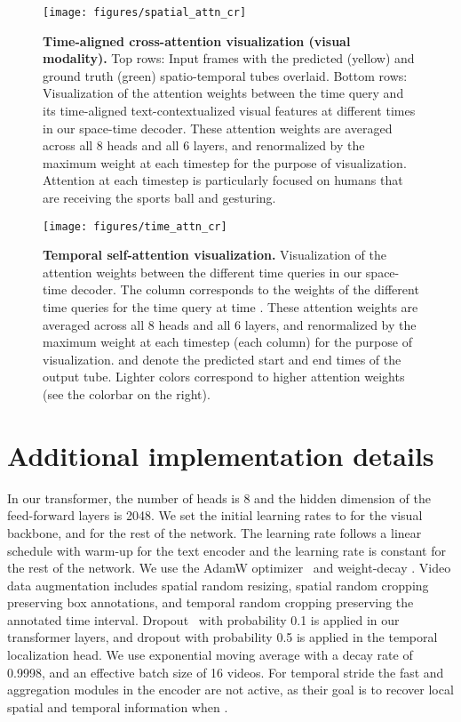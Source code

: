 \begin{figure*}[t]
\centering
\texttt{[image: figures/spatial\_attn\_cr]} 
\caption{\small \textbf{Time-aligned cross-attention visualization (visual modality).} 
Top rows: Input frames with the predicted (yellow) and ground truth (green) spatio-temporal tubes overlaid.
Bottom rows: Visualization of the attention weights between the time query and its time-aligned text-contextualized visual features at different times in our space-time decoder. 
These attention weights are averaged across all 8 heads and all 6 layers, and renormalized by the maximum weight at each timestep for the purpose of visualization.
Attention at each timestep is particularly focused on humans that are receiving the sports ball and gesturing.
}
\label{fig:spaceattn}
\vspace{-1cm}
\end{figure*}

\begin{figure*}[!htbp]
\centering
\texttt{[image: figures/time\_attn\_cr]}
\caption{\small \textbf{Temporal self-attention visualization.}
Visualization of the attention weights between the different time queries in our space-time decoder. 
The column  corresponds to the weights of the different time queries for the time query at time .
These attention weights are averaged across all 8 heads and all 6 layers, and renormalized by the maximum weight at each timestep (\ie each column) for the purpose of visualization.
 and  denote the predicted start and end times of the output tube.
Lighter colors correspond to higher attention weights (see the colorbar on the right).
}
\label{fig:timeattn}
\end{figure*}

\section{Additional implementation details}\label{sec:adddetails}

In our transformer, the number of heads is 8 and the hidden dimension of the feed-forward layers is 2048.
We set the initial learning rates to  for the visual backbone, and  for the rest of the network.
The learning rate follows a linear schedule with warm-up for the text encoder and the learning rate is constant for the rest of the network.
We use the AdamW optimizer~\cite{loshchilov2017decoupled} and weight-decay .
Video data augmentation includes spatial random resizing, spatial random cropping preserving box annotations, and temporal random cropping preserving the annotated time interval.
Dropout~\cite{srivastava2014dropout} with probability 0.1 is applied in our transformer layers, and dropout with probability 0.5 is applied in the temporal localization head.
We use exponential moving average with a decay rate of 0.9998, and an effective batch size of 16 videos.
For temporal stride  the fast and aggregation modules in the encoder are not active, as their goal is to recover local spatial and temporal information when .

